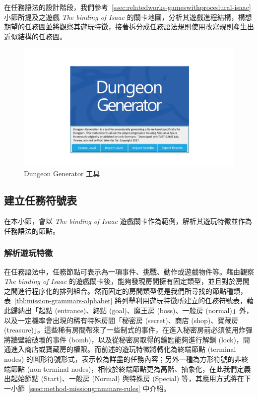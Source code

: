 在任務語法的設計階段，我們參考~\ref{ssec:relatedworks-gameswithprocedural-isaac} 小節所提及之遊戲 \textit{The binding of Isaac} 的關卡地圖，分析其遊戲進程結構，構想期望的任務圖並將觀察其遊玩特徵，接著拆分成任務語法規則使用改寫規則產生出近似結構的任務圖。

\begin{figure}[!htb]
  \begin{center}
    \includegraphics[width=1.0\textwidth]{figures/dungeon_generator.pdf}
    \caption{Dungeon Generator 工具} 
    \label{fig:dungeon-generator}
  \end{center}
\end{figure}

\subsection{建立任務符號表}
\label{ssec:method-missiongrammars-alphabet}

在本小節，會以 \textit{The binding of Isaac} 遊戲關卡作為範例，解析其遊玩特徵並作為任務語法的節點。

\subsubsection{解析遊玩特徵}
\label{sssec:method-missiongrammars-alphabet-extractpatterns}

在任務語法中，任務節點可表示為一項事件、挑戰、動作或遊戲物件等。藉由觀察 \textit{The binding of Isaac} 的遊戲關卡後，能夠發現房間擁有固定類型，並且對於房間之間進行程序化的排列組合。然而固定的房間類型便是我們所尋找的節點種類，表~\ref{tbl:mission-grammars-alphabet} 將列舉利用遊玩特徵所建立的任務符號表，藉此歸納出「起點 (entrance)、終點 (goal)、魔王房 (boss)、一般房 (normal)」外，以及一定機率會出現的稀有特殊房間「秘密房 (secret)、商店 (shop)、寶藏房 (treasure)」。這些稀有房間帶來了一些制式的事件，在進入秘密房前必須使用炸彈將牆壁給破壞的事件 (bomb)，以及從秘密房取得的鑰匙能夠進行解鎖 (lock)，開通進入商店或寶藏房的權限。而前述的遊玩特徵將轉化為終端節點 (terminal nodes) 的圓形符號形式，表示較為詳盡的任務內容；另外一種為方形符號的非終端節點 (non-terminal nodes)，相較於終端節點更為高階、抽象化，在此我們定義出起始節點 (Start)、一般房 (Normal) 與特殊房 (Special) 等，其應用方式將在下一小節~\ref{ssec:method-missiongrammars-rules} 中介紹。

